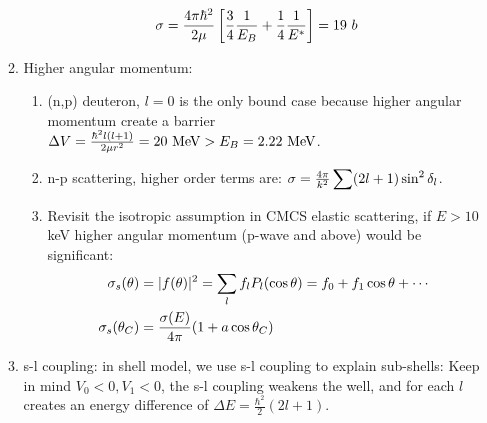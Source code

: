 \documentclass{school-22.101-notes}
\begin{document}
\begin{enumerate}
\begin{enumerate}
\begin{enumerate}
\begin{align}
        \sigma &= \frac{4 \pi \hbar^2}{2 \mu} \left[ \frac{3}{4} \frac{1}{E_B} + \frac{1}{4} \frac{1}{E^*} \right] = 19 \mbox{ } b
        \end{align} 
        \end{enumerate} 
    \item Higher angular momentum:
        \begin{enumerate}
        \item (n,p) deuteron, $l=0$ is the only bound case because higher angular momentum create a barrier $\Delta V = \frac{\hbar^2 l(l+1)}{2 \mu r^2} = 20 \mbox{ } \mathrm{MeV} > E_B = 2.22 \mbox{ } \mathrm{MeV}$. 
        \item n-p scattering, higher order terms are: $\sigma = \frac{4\pi}{k^2} \displaystyle\sum (2l+1) \sin^2 \delta_l$.
        \item Revisit the isotropic assumption in CMCS elastic scattering, if $E > 10$ keV higher angular momentum (p-wave and above) would be significant:
        \begin{align}
        \sigma_s (\theta) &= |f(\theta)|^2 = \displaystyle\sum_l f_l P_l (\cos \theta) = f_0 + f_1 \cos \theta + \cdots \\
        \sigma_s (\theta_C) &= \frac{\sigma(E)}{4 \pi} (1 + a \cos \theta_C)
        \end{align}
        \end{enumerate} 
    \item s-l coupling: in shell model, we use s-l coupling to explain sub-shells:
     Keep in mind $V_0 < 0, V_1 <0$, the s-l coupling weakens the well, and for each $l$ creates an energy difference of $\Delta E = \frac{\hbar^2}{2} (2l+1)$.   
    \end{enumerate} 
\end{enumerate}
\end{document}

